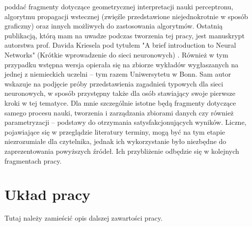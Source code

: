 poddać fragmenty dotyczące geometrycznej interpretacji nauki perceptronu, algorytmu propagacji wstecznej (zwięźle przedstawione niejednokrotnie w sposób graficzny) oraz innych możliwych do zastosowania algorytmów. Ostatnią publikacją, którą mam na uwadze podczas tworzenia tej pracy, jest manuskrypt autorstwa prof. Davida Kriesela pod tytułem "A brief introduction to Neural Networks" (Krótkie wprowadzenie do sieci neuronowych) \cite{Kri07}. Również w tym przypadku wstępna wersja opierała się na zbiorze wykładów wygłaszanych na jednej z niemieckich uczelni -- tym razem Uniwersytetu w Bonn. Sam autor wskazuje na podjęcie próby przedstawienia zagadnień typowych dla sieci neuronowych, w sposób przystępny także dla osób stawiający swoje pierwsze kroki w tej tematyce. Dla mnie szczególnie istotne będą fragmenty dotyczące samego procesu nauki, tworzenia i zarządzania zbiorami danych czy również parametryzacji -- podstawy do otrzymania satysfakcjonujących wyników. Liczne, pojawiające się w przeglądzie literatury terminy, mogą być na tym etapie niezrozumiałe dla czytelnika, jednak ich wykorzystanie było niezbędne do zaprezentowania powyższych źródeł. Ich przybliżenie odbędzie się w kolejnych fragmentach pracy.

\section{Układ pracy}

\iffalse
{\color{red} Tutaj należy zamieścić opis dalszej zawartości pracy.}

